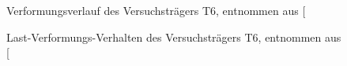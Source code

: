\documentclass[
  11pt,
  letterpaper,
]{scrreprt}
\begin{document}
\begin{figure}[H]


\caption{\label{fig-durchbiegung_laengs_t6}Verformungsverlauf des
Versuchsträgers T6, entnommen aus
{[}\citeproc{ref-sigrist_versuche_1993}{5}{]}}

\end{figure}%

\begin{figure}[H]


\caption{\label{fig-durchbiegung_t6}Last-Verformungs-Verhalten des
Versuchsträgers T6, entnommen aus
{[}\citeproc{ref-sigrist_versuche_1993}{5}{]}}

\end{figure}%
\end{document}
